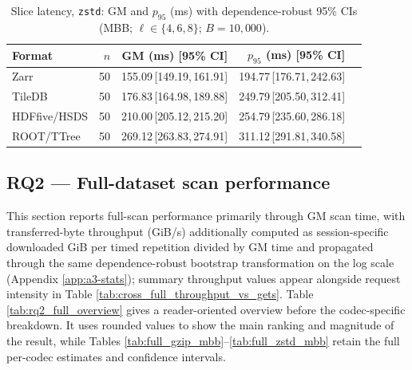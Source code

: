\documentclass[nomenclature, english, bibtex]{kththesis}
\numberwithin{listing}{chapter}
\begin{document}
\begin{table}[H]
  \centering
  \caption{Slice latency, \texttt{zstd}: \gls{GM} and $p_{95}$ (ms) with dependence-robust 95\% CIs (\gls{MBB}; $\ell\in\{4,6,8\}$; $B{=}10{,}000$).}
  \label{tab:slice_zstd_mbb}
  \begin{tabular}{lrrrr}
    \toprule
    Format & $n$ & \gls{GM} (ms) [95\% \gls{CI}] & $p_{95}$ (ms) [95\% \gls{CI}] \\
    \midrule
    Zarr   & 50 & 155.09\,[149.19,\,161.91] & 194.77\,[176.71,\,242.63] \\
    TileDB & 50 & 176.83\,[164.98,\,189.88] & 249.79\,[205.50,\,312.41] \\
    \gls{HDFfive}/\gls{HSDS}   & 50 & 210.00\,[205.12,\,215.20] & 254.79\,[235.60,\,286.18] \\
    \gls{ROOT}/\gls{TTree}   & 50 & 269.12\,[263.83,\,274.91] & 311.12\,[291.81,\,340.58] \\
    \bottomrule
  \end{tabular}
\end{table}


\subsection{RQ2 — Full-dataset scan performance}
\label{sec:rq2-results}
This section reports full-scan performance primarily through \gls{GM} scan time, with transferred-byte throughput (GiB/s) additionally computed as session-specific downloaded GiB per timed repetition divided by \gls{GM} time and propagated through the same dependence-robust bootstrap transformation on the log scale (Appendix \ref{app:a3-stats}); summary throughput values appear alongside request intensity in Table \ref{tab:cross_full_throughput_vs_gets}. Table \ref{tab:rq2_full_overview} gives a reader-oriented overview before the codec-specific breakdown. It uses rounded values to show the main ranking and magnitude of the result, while Tables \ref{tab:full_gzip_mbb}--\ref{tab:full_zstd_mbb} retain the full per-codec estimates and confidence intervals.
\end{document}
